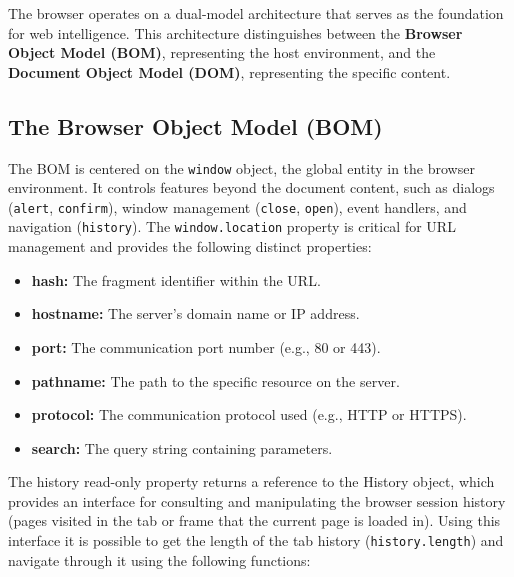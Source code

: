 \documentclass{scrbook}
\begin{document}
	The browser operates on a dual-model architecture that serves as the foundation for web intelligence. This architecture distinguishes between the \textbf{Browser Object Model (BOM)}, representing the host environment, and the \textbf{Document Object Model (DOM)}, representing the specific content.
	
	\subsection{The Browser Object Model (BOM)}
	
	The BOM is centered on the \texttt{window} object, the global entity in the browser environment. It controls features beyond the document content, such as dialogs (\texttt{alert}, \texttt{confirm}), window management (\texttt{close}, \texttt{open}), event handlers, and navigation (\texttt{history}). The \texttt{window.location} property is critical for URL management and provides the following distinct properties:
	
	\begin{itemize}
	    \item \textbf{hash:} The fragment identifier within the URL.
	    \item \textbf{hostname:} The server's domain name or IP address.
	    \item \textbf{port:} The communication port number (e.g., 80 or 443).
	    \item \textbf{pathname:} The path to the specific resource on the server.
	    \item \textbf{protocol:} The communication protocol used (e.g., HTTP or HTTPS).
	    \item \textbf{search:} The query string containing parameters.
	\end{itemize}
	
	The history read-only property returns a reference to the History object, which provides an interface for consulting and manipulating the browser session history (pages visited in the tab or frame that the current page is loaded in). Using this interface it is possible to get the length of the tab history (\texttt{history.length}) and navigate through it using the following functions:
	
\end{document}
